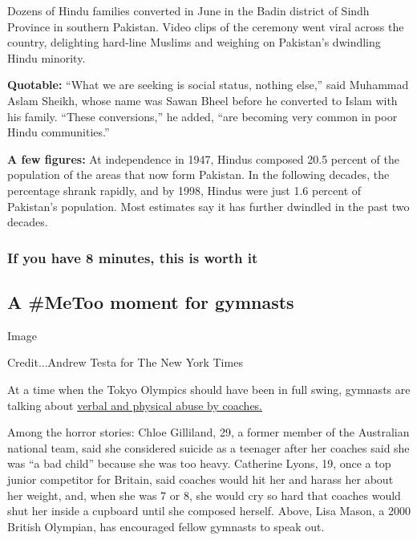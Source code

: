 Dozens of Hindu families converted in June in the Badin district of
Sindh Province in southern Pakistan. Video clips of the ceremony went
viral across the country, delighting hard-line Muslims and weighing on
Pakistan's dwindling Hindu minority.

\textbf{Quotable:} ``What we are seeking is social status, nothing
else,'' said Muhammad Aslam Sheikh, whose name was Sawan Bheel before he
converted to Islam with his family. ``These conversions,'' he added,
``are becoming very common in poor Hindu communities.''

\textbf{A few figures:} At independence in 1947, Hindus composed 20.5
percent of the population of the areas that now form Pakistan. In the
following decades, the percentage shrank rapidly, and by 1998, Hindus
were just 1.6 percent of Pakistan's population. Most estimates say it
has further dwindled in the past two decades.

\hypertarget{if-you-have-8-minutes-this-is-worth-it}{%
\subsubsection{If you have 8 minutes, this is worth
it}\label{if-you-have-8-minutes-this-is-worth-it}}

\hypertarget{a-metoo-moment-for-gymnasts}{%
\subsection{A \#MeToo moment for
gymnasts}\label{a-metoo-moment-for-gymnasts}}

Image

Credit...Andrew Testa for The New York Times

At a time when the Tokyo Olympics should have been in full swing,
gymnasts are talking about
\href{https://www.nytimes.com/2020/08/03/sports/olympics/gymnastics-abuse-athlete-a.html}{verbal
and physical abuse by coaches.}

Among the horror stories: Chloe Gilliland, 29, a former member of the
Australian national team, said she considered suicide as a teenager
after her coaches said she was ``a bad child'' because she was too
heavy. Catherine Lyons, 19, once a top junior competitor for Britain,
said coaches would hit her and harass her about her weight, and, when
she was 7 or 8, she would cry so hard that coaches would shut her inside
a cupboard until she composed herself. Above, Lisa Mason, a 2000 British
Olympian, has encouraged fellow gymnasts to speak out.

